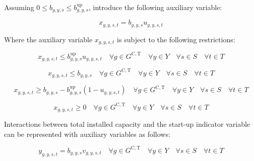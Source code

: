 \documentclass{article}
\newcommand{\sGeneratorsCandidateThermal}{G^{\mathrm{C,T}}}
\newcommand{\sYears}{Y}
\newcommand{\sScenarios}{S}
\newcommand{\sIntervals}{T}
\newcommand{\iGenerator}{g}
\newcommand{\iYear}{y}
\newcommand{\iScenario}{s}
\newcommand{\iInterval}{t}
\newcommand{\vStartupIndicator}[1][\iGenerator,\iYear,\iScenario,\iInterval]{v_{#1}}
\newcommand{\vOnIndicator}[1][\iGenerator,\iYear,\iScenario,\iInterval]{u_{#1}}
\newcommand{\vInstalledCapacityTotalScenario}[1][\iGenerator,\iYear,\iScenario]{b_{#1}}
\newcommand{\vInstalledCapacityOnStateAux}[1][\iGenerator,\iYear,\iScenario,\iInterval]{x_{#1}}
\newcommand{\vInstalledCapacityStartupStateAux}[1][\iGenerator,\iYear,\iScenario,\iInterval]{y_{#1}}
\begin{document}
Assuming $0 \leq \vInstalledCapacityTotalScenario \leq \vInstalledCapacityTotalScenario^{\mathrm{up}}$, introduce the following auxiliary variable:

\begin{equation}
	\vInstalledCapacityOnStateAux = \vInstalledCapacityTotalScenario \vOnIndicator
\end{equation}

Where the auxiliary variable $\vInstalledCapacityOnStateAux$ is subject to the following restrictions:

\begin{equation}
	\vInstalledCapacityOnStateAux \leq \vInstalledCapacityTotalScenario^{\mathrm{up}} \vOnIndicator \quad \forall \iGenerator \in \sGeneratorsCandidateThermal \quad \forall \iYear \in \sYears \quad \forall \iScenario \in \sScenarios \quad \forall \iInterval \in \sIntervals
	\label{eqn: on state aux variable block start}
\end{equation}

\begin{equation}
	\vInstalledCapacityOnStateAux \leq \vInstalledCapacityTotalScenario \quad \forall \iGenerator \in \sGeneratorsCandidateThermal \quad \forall \iYear \in \sYears \quad \forall \iScenario \in \sScenarios \quad \forall \iInterval \in \sIntervals
\end{equation}

\begin{equation}
	\vInstalledCapacityOnStateAux \geq \vInstalledCapacityTotalScenario - \vInstalledCapacityTotalScenario^{\mathrm{up}} \left(1 - \vOnIndicator \right) \quad \forall \iGenerator \in \sGeneratorsCandidateThermal \quad \forall \iYear \in \sYears \quad \forall \iScenario \in \sScenarios \quad \forall \iInterval \in \sIntervals
\end{equation}

\begin{equation}
	\vInstalledCapacityOnStateAux \geq 0 \quad \forall \iGenerator \in \sGeneratorsCandidateThermal \quad \forall \iYear \in \sYears \quad \forall \iScenario \in \sScenarios \quad \forall \iInterval \in \sIntervals
	\label{eqn: on state aux variable block end}
\end{equation}

Interactions between total installed capacity and the start-up indicator variable can be represented with auxiliary variables as follows:

\begin{equation}
\vInstalledCapacityStartupStateAux = \vInstalledCapacityTotalScenario \vStartupIndicator \quad \forall \iGenerator \in \sGeneratorsCandidateThermal \quad \forall \iYear \in \sYears \quad \forall \iScenario \in \sScenarios \quad \forall \iInterval \in \sIntervals
\end{equation}
\end{document}

